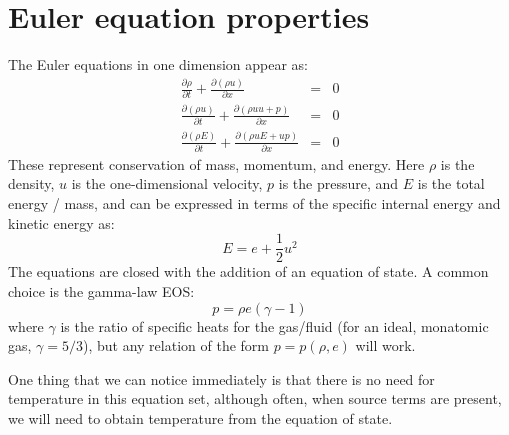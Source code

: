 \label{ch:compressible}

\begin{quote}
\end{quote}

\section{Euler equation properties}

The Euler equations in one dimension appear as:
\begin{eqnarray}
\frac{\partial \rho}{\partial t} + 
    \frac{\partial (\rho u)}{\partial x} &=& 0 \\
%
\frac{\partial(\rho u)}{\partial t} +
    \frac{\partial (\rho uu + p)}{\partial x} &=& 0 \\
%
\frac{\partial(\rho E)}{\partial t} + 
    \frac{\partial(\rho u E + u p)}{\partial x} &=& 0
\end{eqnarray}
These represent conservation of mass, momentum, and energy.  Here $\rho$ is the
density, $u$ is the one-dimensional velocity, $p$ is the pressure, and $E$
is the total energy / mass, and can be expressed in terms of the
specific internal energy and kinetic energy as:
\begin{equation}
E = e + \frac{1}{2} u^2
\end{equation}
The equations are closed with the addition of an equation of state.  A common
choice is the gamma-law EOS:
\begin{equation}
p = \rho e(\gamma - 1)
\end{equation}
where $\gamma$ is the ratio of specific heats for the gas/fluid (for
an ideal, monatomic gas, $\gamma = 5/3$), but any relation of the form
$p = p(\rho, e)$ will work.  

One thing that we can notice immediately is that there is no need for
temperature in this equation set, although often, when source terms
are present, we will need to obtain temperature from the equation of
state.

